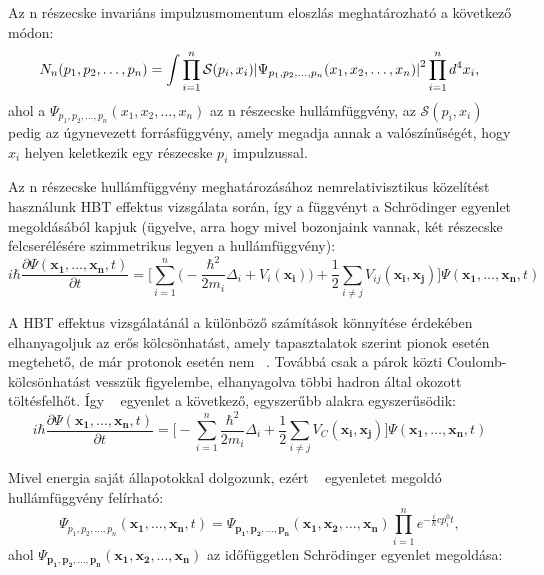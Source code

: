 \documentclass[10pt,a4paper]{article}
\numberwithin{equation}{subsection}
\numberwithin{figure}{section}
\begin{document}
Az n részecske invariáns impulzusmomentum eloszlás meghatározható a következő módon:
\begin{equation}
N_n(p_1, p_2, \dots, p_n) = \int \prod_{i=1}^{n}\mathcal{S}(p_i, x_i)\abs{\Psi_{p_1, {p_2}, \dots, {p_n}}({x_1}, {x_2}, \dots, {x_n})}^2\prod_{i=1}^{n}d^4 x_i,
\label{eq:Nn}
\end{equation}
ahol a $\Psi_{p_1, {p_2}, \dots, {p_n}}({x_1}, {x_2}, \dots, {x_n})$ az n részecske hullámfüggvény, az $\mathcal{S}({p_i}, {x_i})$ pedig az úgynevezett forrásfüggvény, amely megadja annak a valószínűségét, hogy ${x_i}$ helyen keletkezik egy részecske ${p_i}$ impulzussal.

Az n részecske hullámfüggvény meghatározásához nemrelativisztikus közelítést használunk HBT effektus vizsgálata során, így a függvényt a Schrödinger egyenlet megoldásából kapjuk (ügyelve, arra hogy mivel bozonjaink vannak, két részecske felcserélésére szimmetrikus legyen a hullámfüggvény):
\begin{equation}
i\hbar\frac{\partial \Psi(\bm{x_1},\dots, \bm{x_n},t )}{\partial t} = \Bigg[\sum_{i=1}^{n}\bigg(-\frac{\hbar^2}{2m_i}\Delta_i + V_i(\bm{x_i})\bigg) + \frac{1}{2}\sum_{i\neq j} V_{ij}(\bm{x_i},\bm{x_j})\Bigg]\Psi(\bm{x_1},\dots, \bm{x_n} ,t)
\label{eq:Sch0}
\end{equation}

A HBT effektus vizsgálatánál a különböző számítások könnyítése érdekében elhanyagoljuk az erős kölcsönhatást, amely tapasztalatok szerint pionok esetén megtehető, de már protonok esetén nem ~\cite{Pratt:1990zq}. Továbbá csak a párok közti Coulomb-kölcsönhatást vesszük figyelembe, elhanyagolva többi hadron által okozott töltésfelhőt. Így ~ egyenlet a következő, egyszerűbb alakra egyszerűsödik:
\begin{equation}
i\hbar\frac{\partial \Psi(\bm{x_1},\dots, \bm{x_n},t )}{\partial t} = \Bigg[-\sum_{i=1}^{n}\frac{\hbar^2}{2m_i}\Delta_i + \frac{1}{2}\sum_{i\neq j} V_C(\bm{x_i},\bm{x_j})\Bigg]\Psi(\bm{x_1},\dots, \bm{x_n} ,t)
\label{eq:Sch}
\end{equation}

Mivel energia saját állapotokkal dolgozunk, ezért  ~ egyenletet megoldó hullámfüggvény felírható:
\begin{equation}
\Psi_{p_1, {p_2}, \dots, {p_n}}(\bm{x_1},\dots, \bm{x_n},t )  
= \Psi_{\bm{p_1}, \bm{p_2}, \dots, \bm{p_n}}(\bm{x_1}, \bm{x_2}, \dots, \bm{x_n})\prod_{i=1}^ne^{-\frac{i}{\hbar}cp_i^0t},
\end{equation}
ahol $\Psi_{\bm{p_1}, \bm{p_2}, \dots, \bm{p_n}}(\bm{x_1}, \bm{x_2}, \dots, \bm{x_n})$ az időfüggetlen Schrödinger egyenlet megoldása:
\end{document}

